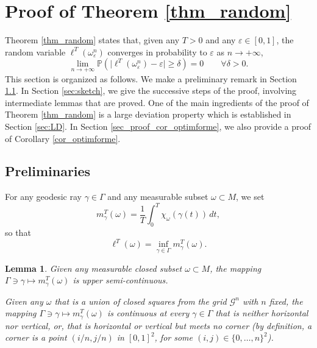 \documentclass[JEP,XML,SOM,Unicode, NoEqCountersInSection,NoFloatCountersInSection,published]{cedram}
\newtheorem{lemma}{Lemma}
\theoremstyle{definition}
\begin{document}
\section{Proof of Theorem \ref{thm_random}}\label{sec_random}
Theorem \ref{thm_random} states that, given any $T>0$ and any $ \varepsilon \in [0, 1]$, the random variable $\ell^T(\omega_\varepsilon^n)$ converges in probability to $\varepsilon$ as $n\to +\infty$, \ie
\[
\lim_{n\to +\infty}\mathbb{P}\left(\vert\ell^T(\omega_\varepsilon^n) - \varepsilon \vert \geq \delta\right) = 0 \qquad \forall \delta>0.
\]
This section is organized as follows.
We make a preliminary remark in Section \ref{sec_prelim}.
In Section \ref{sec:sketch}, we give the successive steps of the proof, involving intermediate lemmas that are proved. One of the main ingredients of the proof of Theorem \ref{thm_random} is a large deviation property which is established in Section \ref{sec:LD}.
In Section \ref{sec_proof_cor_optimforme}, we also provide a proof of Corollary \ref{cor_optimforme}.

\subsection{Preliminaries}\label{sec_prelim}
For any geodesic ray $\gamma\!\in\!\Gamma$ and any measurable subset $\omega\!\subset\!M$, we set\vspace*{-3pt}
\begin{equation*}
m^T_\gamma(\omega) = \frac{1}{T}\int_0^T\chi_\omega(\gamma(t))\, dt,
\end{equation*}
so that\vspace*{-3pt}
\begin{equation}\label{lTmT}
\ell^T(\omega) = \inf_{\gamma \in \Gamma} m^T_\gamma(\omega).
\end{equation}

\begin{lemma}\label{lem3hv}
Given any measurable {closed} subset $\omega\subset M$, the mapping $\Gamma\ni \gamma \mapsto m^T_\gamma(\omega)$ is upper semi-continuous.

Given any $\omega$ that is a union of {closed} squares from the grid $\mathcal{G}^n$ with $n$ fixed, the mapping $\Gamma\ni \gamma \mapsto m^T_\gamma(\omega)$ is continuous at every $\gamma\in\Gamma$ that is neither horizontal nor vertical, or, that is horizontal {or} vertical but meets no corner (by definition, a corner is a point $(i/n,j/n)$ in $[0,1]^2$, for some $(i,j)\in\{0,\ldots,n\}^2$).
\end{lemma}
\end{document}
